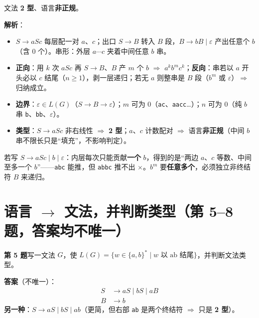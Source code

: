 \documentclass[12pt,a4paper,fontset=windows]{ctexart}
\newcommand{\bad}{\ensuremath{\times}}
\newcommand{\imp}{\ensuremath{\Rightarrow}}
\begin{document}
文法 \textbf{2 型}、语言\textbf{非正规}。

\textbf{解析}：
\begin{itemize}
\item $S \to aSc$ 每层配一对 $a$、$c$；出口 $S \to B$ 转入 $B$ 段，$B \to bB \mid \varepsilon$ 产出任意个 $b$（含 0 个）。串形：外层 $a \cdots c$ 夹着中间任意 $b$ 串。
\item \textbf{正向}：用 $k$ 次 $aSc$ 再 $S \to B$、$B$ 产 $m$ 个 $b$ \imp{} $a^k b^m c^k$；\textbf{反向}：串若以 $a$ 开头必以 $c$ 结尾（$n \ge 1$），剥一层递归；若无 $a$ 则整串是 $B$ 段（$b^m$ 或 $\varepsilon$）\imp{} 归纳成立。
\item \textbf{边界}：\textbf{$\varepsilon \in L(G)$}（$S \to B \to \varepsilon$）；$m$ 可为 $0$（\texttt{ac}、\texttt{aacc}…）；$n$ 可为 $0$（纯 $b$ 串 \texttt{b}、\texttt{bb}、$\varepsilon$）。
\item \textbf{类型}：$S \to aSc$ 非右线性 \imp{} \textbf{2 型}；$a$、$c$ 计数配对 \imp{} 语言\textbf{非正规}（中间 $b$ 串不限长只是``填充''，不影响判定）。
\end{itemize}

\begin{warnbox}[出口不能图省事]
若写 $S \to aSc \mid b \mid \varepsilon$：内层每次只能贡献\textbf{一个} $b$，得到的是``两边 $a$、$c$ 等数、中间至多一个 $b$''——\texttt{abc} 能推，但 \texttt{abbc} 推不出 \bad。$b^m$ 要\textbf{任意多个}，必须独立非终结符 $B$ 来递归。
\end{warnbox}

\section{\texorpdfstring{语言 $\to$ 文法，并判断类型（第 5--8 题，答案均不唯一）}{语言→文法，并判断类型（第 5–8 题，答案均不唯一）}}

\begin{qbox}
{\large\bfseries 第 5 题}\quad 写一文法 $G$，使 $L(G)=\{w \in \{a,b\}^* \mid w \text{ 以 ab 结尾}\}$，并判断文法类型。
\end{qbox}

\textbf{答案}（不唯一）：
\[
\begin{aligned}
S &\to aS \mid bS \mid aB\\
B &\to b
\end{aligned}
\]
\textbf{另一种}：$S \to aS \mid bS \mid ab$（更简，但右部 \texttt{ab} 是两个终结符 \imp{} 只是 \textbf{2 型}）。
\end{document}
